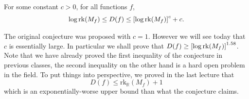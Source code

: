 \documentclass[letterpaper]{article}
\newcommand{\reals}{\mathbb{R}}
\providecommand\sqbrac[1]{\ensuremath \left[#1\right]}
\newcommand{\rk}{\mathrm{rk}}
\newcommand{\mf}{M_f}
\newcommand{\df}{D(f)}
\begin{document}
\begin{conjecture}
\label{conj:log_rank}
For some constant $c > 0$, for all functions $f$,
$$
\log \rk (\mf) \leq \df \leq \sqbrac{\log \rk (\mf)}^c + c.
$$
\end{conjecture}
\begin{remark}
The original conjecture was proposed with $c=1$. However we will see today that $c$ is essentially large. In particular we shall prove that $\df \geq \sqbrac{\log \rk (\mf)}^{1.58}$.
Note that we have already proved the first inequality of the conjecture in previous classes, the second inequality on the other hand is a hard open problem in the field. To put things into perspective, we proved in the last lecture that
$$
\df \leq \rk_\reals (\mf) + 1
$$
which is an exponentially-worse upper bound than what the conjecture claims.
\end{remark}
\end{document}
